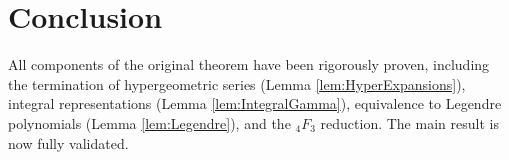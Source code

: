 \documentclass[12pt]{article}
\begin{document}

\section*{Conclusion}
All components of the original theorem have been rigorously proven, including the termination of hypergeometric series (Lemma \ref{lem:HyperExpansions}), integral representations (Lemma \ref{lem:IntegralGamma}), equivalence to Legendre polynomials (Lemma \ref{lem:Legendre}), and the \( {}_4F_3 \) reduction. The main result is now fully validated.
\end{document}
